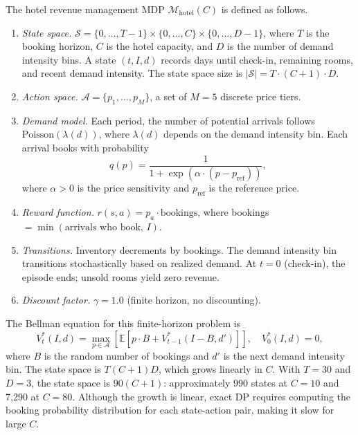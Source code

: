 \begin{definition}
\label{def:hotel_mdp}
The hotel revenue management MDP $\mathcal{M}_{\mathrm{hotel}}(C)$ is defined as follows.
\begin{enumerate}
    \item \emph{State space.} $\mathcal{S} = \{0, \ldots, T-1\} \times \{0, \ldots, C\} \times \{0, \ldots, D-1\}$, where $T$ is the booking horizon, $C$ is the hotel capacity, and $D$ is the number of demand intensity bins. A state $(t, I, d)$ records days until check-in, remaining rooms, and recent demand intensity. The state space size is $|\mathcal{S}| = T \cdot (C + 1) \cdot D$.
    \item \emph{Action space.} $\mathcal{A} = \{p_1, \ldots, p_M\}$, a set of $M = 5$ discrete price tiers.
    \item \emph{Demand model.} Each period, the number of potential arrivals follows $\mathrm{Poisson}(\lambda(d))$, where $\lambda(d)$ depends on the demand intensity bin. Each arrival books with probability
    \begin{equation}
    \label{eq:hotel_booking_prob}
    q(p) = \frac{1}{1 + \exp(\alpha \cdot (p - p_{\mathrm{ref}}))},
    \end{equation}
    where $\alpha > 0$ is the price sensitivity and $p_{\mathrm{ref}}$ is the reference price.
    \item \emph{Reward function.} $r(s, a) = p_a \cdot \text{bookings}$, where bookings $= \min(\text{arrivals who book},\, I)$.
    \item \emph{Transitions.} Inventory decrements by bookings. The demand intensity bin transitions stochastically based on realized demand. At $t = 0$ (check-in), the episode ends; unsold rooms yield zero revenue.
    \item \emph{Discount factor.} $\gamma = 1.0$ (finite horizon, no discounting).
\end{enumerate}
\end{definition}

The Bellman equation for this finite-horizon problem is
\begin{equation}
\label{eq:hotel_bellman}
V^*_t(I, d) = \max_{p \in \mathcal{A}} \left[ \mathbb{E}\left[ p \cdot B + V^*_{t-1}(I - B, d') \right] \right], \quad V^*_0(I, d) = 0,
\end{equation}
where $B$ is the random number of bookings and $d'$ is the next demand intensity bin. The state space is $T(C+1)D$, which grows linearly in $C$. With $T = 30$ and $D = 3$, the state space is $90(C + 1)$: approximately 990 states at $C = 10$ and 7,290 at $C = 80$. Although the growth is linear, exact DP requires computing the booking probability distribution for each state-action pair, making it slow for large $C$.

